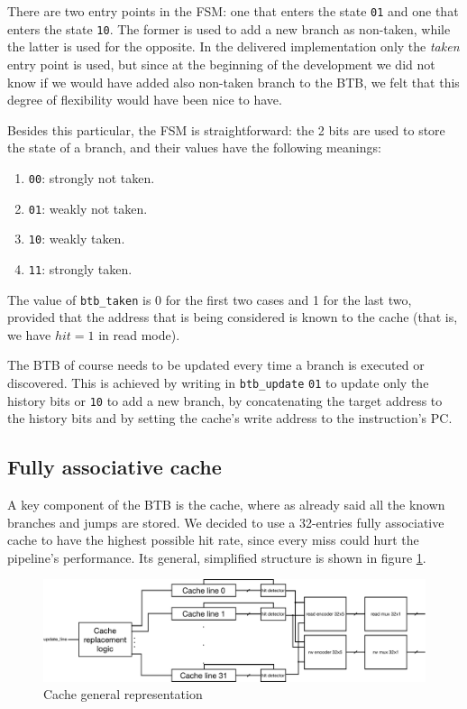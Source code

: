 There are two entry points in the FSM: one that enters the state \verb|01| and one that enters the state \verb|10|. The former is used to add a new branch as non-taken,
while the latter is used for the opposite. In the delivered implementation only the {\it taken} entry point is used, but since at the beginning of the development we did not
know if we would have added also non-taken branch to the BTB, we felt that this degree of flexibility would have been nice to have.

Besides this particular, the FSM is straightforward: the 2 bits are used to store the state of a branch, and their values have the following meanings:

\begin{enumerate}
    \item \verb|00|: strongly not taken.
    \item \verb|01|: weakly not taken.
    \item \verb|10|: weakly taken.
    \item \verb|11|: strongly taken.
\end{enumerate}

The value of \verb|btb_taken| is 0 for the first two cases and 1 for the last two, provided that the address that is being considered is known to the cache (that is, we have $hit = 1$ in read mode).

The BTB of course needs to be updated every time a branch is executed or discovered. This is achieved by writing in \verb|btb_update| \verb|01| to update only the history bits or \verb|10| to add a new
branch, by concatenating the target address to the history bits and by setting the cache's write address to the instruction's PC.

\subsection{Fully associative cache}
\label{subsec:fully_cache}

A key component of the BTB is the cache, where as already said all the known branches and jumps are stored. We decided to use a 32-entries fully associative cache to have the highest possible hit rate,
since every miss could hurt the pipeline's performance. Its general, simplified structure is shown in figure \ref{fig:BTB_cache}.

\begin{figure}[!ht]
	\centering
	\includegraphics[width=\linewidth]{./chapters/figures/BTB_cache.pdf}
    \caption{Cache general representation}
    \label{fig:BTB_cache}
\end{figure}

